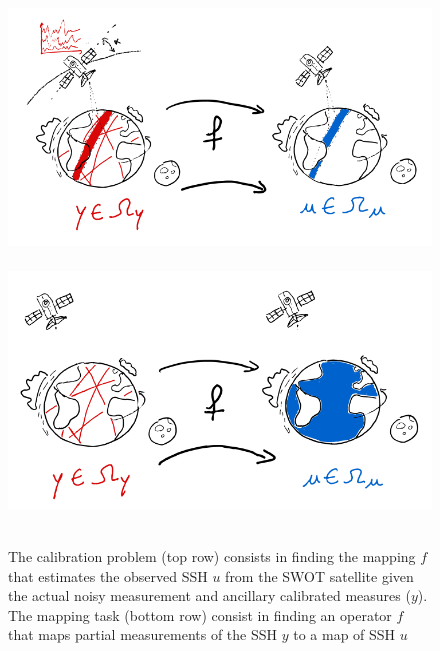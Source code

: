 \begin{bibunit}
{{{{\begin{figure}[htbp]
\begin{center}
\begin{tabular}[c]
\includegraphics[width=0.8\linewidth]{Chapitre1/Ch1-Figures/Cal_drawing.png} \
\includegraphics[width=0.8\linewidth]{Chapitre1/Ch1-Figures/Mapping_drawing.png} \
\end{tabular}
\end{center}
\caption[Swot calibration and altimetry mapping problem illustration]
{\footnotesize The calibration problem (top row) consists in finding the mapping $f$ that estimates the observed SSH $u$ from the SWOT satellite given the actual noisy measurement and ancillary calibrated measures ($y$).
The mapping task (bottom row) consist in finding an operator $f$ that maps partial measurements of the SSH $y$ to a map of SSH $u$}
\label{fig:planet_drawings}
\end{figure}

}}}}
\end{bibunit}

